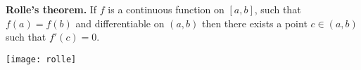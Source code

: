 \documentclass[12pt]{article}
\begin{document}
\textbf{Rolle's theorem.} If $f$ is a continuous function on $[a,b]$, such that $f(a)=f(b)$ and differentiable on $(a,b)$ then there exists a point $c\in(a,b)$ such that $f'(c)=0$.


\texttt{[image: rolle]}
\end{document}
